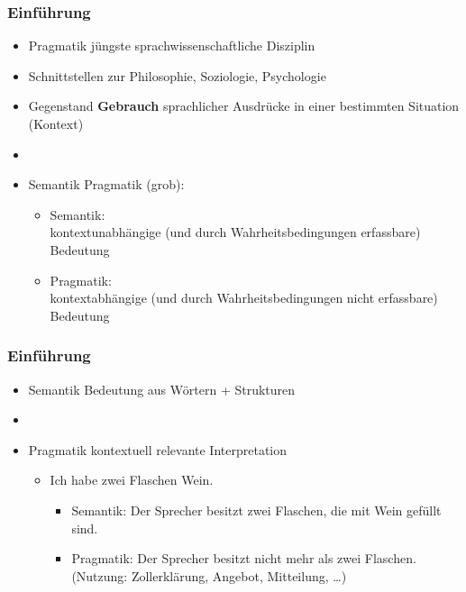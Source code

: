 \begin{frame}
\frametitle{Einführung}

\begin{itemize}
	\item Pragmatik \ras jüngste sprachwissenschaftliche Disziplin
	\item Schnittstellen zur Philosophie, Soziologie, Psychologie
	\item Gegenstand \ras \textbf{Gebrauch} sprachlicher Ausdrücke in einer bestimmten Situation (Kontext)
	\item[]
	\item Semantik \vs Pragmatik (grob):
	
	\begin{itemize}
		\item Semantik:\\
kontextunabhängige (und durch Wahrheitsbedingungen erfassbare) Bedeutung
		\item Pragmatik: \\
kontextabhängige  (und durch Wahrheitsbedingungen nicht erfassbare) Bedeutung
	\end{itemize}
	
\end{itemize}

\end{frame}



\begin{frame}
\frametitle{Einführung}

\begin{itemize}
	\item Semantik \ras Bedeutung aus Wörtern + Strukturen
	\item[]
	\item Pragmatik \ras kontextuell relevante Interpretation
	
	\begin{itemize}
		\item Ich habe zwei Flaschen Wein.
		
		\begin{itemize}
			\item Semantik: Der Sprecher besitzt zwei Flaschen, die mit Wein gefüllt sind.
			\item Pragmatik: Der Sprecher besitzt nicht mehr als zwei Flaschen. (Nutzung: Zollerklärung, Angebot, Mitteilung, \dots)
		\end{itemize}
	\end{itemize}
\end{itemize}

\end{frame}


